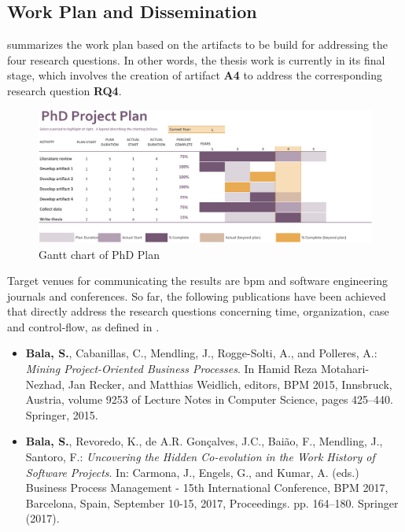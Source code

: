 \documentclass[a4paper,11pt]{article}
\begin{document}
\subsection{Work Plan and Dissemination}
 summarizes the work plan based on the artifacts to be build for addressing the four research questions. In other words, the thesis work is currently in its final stage, which involves the creation of artifact \textbf{A4} to address the corresponding research question \textbf{RQ4}. 

\begin{figure}[]
	\centering
	\includegraphics[width=\linewidth]{figures/PhD-plan-crop}
	\caption{Gantt chart of PhD Plan}
	\label{fig:phd-plan}
\end{figure}

Target venues for communicating the results are \gls{bpm} and software engineering journals and conferences.  
So far, the following publications have been achieved that directly address the research questions concerning time, organization, case and control-flow, as defined in .\\


	
	\begin{itemize}
	\item \textbf{Bala, S.}, Cabanillas, C., Mendling, J., Rogge-Solti, A., and Polleres, A.: \textit{Mining Project-Oriented Business Processes}. In Hamid Reza Motahari-Nezhad, Jan Recker, and Matthias Weidlich, editors, BPM 2015, Innsbruck, Austria, volume 9253 of Lecture Notes in Computer Science, pages 425--440. Springer, 2015. \cite{Bala2015}
	\end{itemize}


\begin{itemize}
	\item \textbf{Bala, S.}, Revoredo, K., de A.R. Gonçalves, J.C., Baião, F., Mendling, J., Santoro, F.: \textit{Uncovering the Hidden Co-evolution in the Work History of Software Projects}. In: Carmona, J., Engels, G., and Kumar, A. (eds.) Business Process Management - 15th International Conference, BPM 2017, Barcelona, Spain, September 10-15, 2017, Proceedings. pp. 164--180. Springer (2017). \cite{Bala2017a}
\end{itemize}
\end{document}
